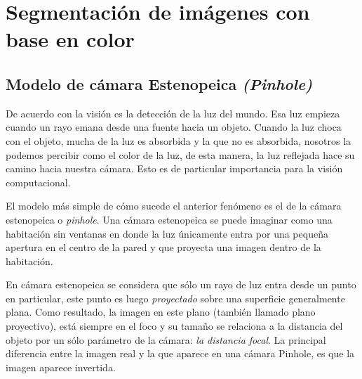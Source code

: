 \documentclass{book}
\begin{document}
\chapter{ Segmentación de imágenes con base en color}
\section{Modelo de cámara Estenopeica \textit{(Pinhole)}}
De acuerdo con \cite{bradski2008learning} la visión es la detección de la luz del mundo. Esa luz empieza cuando un rayo emana desde una fuente hacia un objeto. Cuando la luz choca con el objeto, mucha de la luz es absorbida y la que no es absorbida, nosotros la podemos percibir como el color de la luz, de esta manera, la luz reflejada hace su camino hacia nuestra cámara. Esto es de particular importancia para la visión computacional.

El modelo más simple de cómo sucede el anterior fenómeno es el de la cámara estenopeica o \textit{pinhole}. Una cámara estenopeica se puede imaginar como una habitación sin ventanas en donde la luz únicamente entra por una pequeña apertura en el centro de la pared y que proyecta una imagen dentro de la habitación.

En cámara estenopeica se considera que sólo un rayo de luz entra desde un punto en particular, este punto es luego \textit{proyectado} sobre una superficie generalmente plana. Como resultado, la imagen en este plano (también llamado plano proyectivo), está siempre en el foco y su tamaño se relaciona a la distancia del objeto por un sólo parámetro de la cámara: \textit{la distancia focal}. La principal diferencia entre la imagen real y la que aparece en una cámara Pinhole, es que la imagen aparece invertida. 
	
\end{document}

